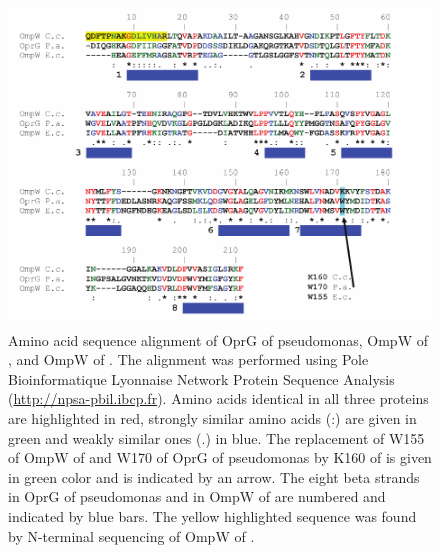 \begin{figure}[htb]
  	\begin{center}
   		\includegraphics[]{porin_chapter/img/Fig5-seqalign.pdf}
   	\end{center}
   	\caption[Amino acid sequence alignment of OprG of \acl{pseudomonas}, OmpW of \ecoli, and OmpW of \caulobacter]{Amino acid sequence alignment of OprG of \ac{pseudomonas}, OmpW of \ecoli, and OmpW of \caulobacter.
The alignment was performed using Pole Bioinformatique Lyonnaise Network Protein Sequence Analysis (\url{http://npsa-pbil.ibcp.fr}). Amino acids identical in all three proteins are highlighted in red, strongly similar amino acids (:) are given in green and weakly similar ones (.) in blue. The replacement of W155 of OmpW of \ecoli and W170 of OprG of \ac{pseudomonas} by K160 of \caulobacter is given in green color and is indicated by an arrow. The eight beta strands in OprG of \ac{pseudomonas} and in OmpW of \ecoli are numbered and indicated by blue bars. The yellow highlighted sequence was found by N-terminal sequencing of OmpW of \caulobacter.
   	}
   	\label{fig:porin-seqalign}
\end{figure}   

